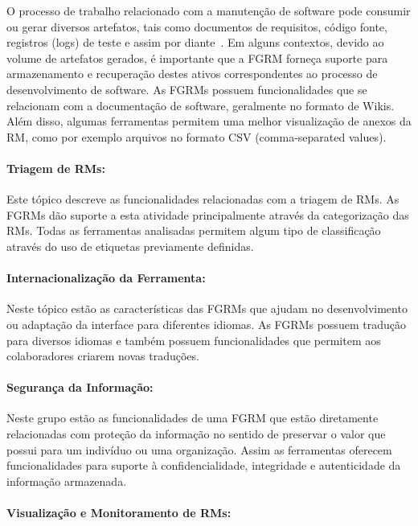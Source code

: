 O processo de trabalho relacionado com a manutenção de software pode consumir
ou gerar diversos artefatos, tais como documentos de requisitos, código fonte,
registros (logs) de teste e assim por diante~\cite{cavalcanti2013bug}. Em
alguns contextos, devido ao volume de artefatos gerados, é importante que a
FGRM forneça suporte para armazenamento e recuperação destes ativos
correspondentes ao processo de desenvolvimento de software. As FGRMs possuem
funcionalidades que se relacionam com a documentação de software,
geralmente no formato de Wikis. Além disso, algumas ferramentas permitem uma
melhor visualização de anexos da RM, como por exemplo arquivos no formato CSV
(comma-separated values).

\paragraph{Triagem de RMs:}\label{par:triagem_de_rm_s}

Este tópico descreve as funcionalidades relacionadas com a triagem de RMs. As
FGRMs dão suporte a esta atividade principalmente através da categorização das
RMs. Todas as ferramentas analisadas permitem algum tipo de classificação
através do uso de etiquetas previamente definidas.

\paragraph{Internacionalização da Ferramenta:}\label{par:internacionalização_da_ferramenta}

Neste tópico estão as características das FGRMs que ajudam no desenvolvimento
ou adaptação da interface para diferentes idiomas. As FGRMs possuem tradução
para diversos idiomas e também possuem funcionalidades que permitem aos
colaboradores criarem novas traduções.

\paragraph{Segurança da Informação:}
\label{par:segurança_da_informação}

Neste grupo estão as funcionalidades de uma FGRM que estão diretamente
relacionadas com proteção da informação no sentido de preservar o valor que
possui para um indivíduo ou uma organização. Assim as ferramentas oferecem
funcionalidades para suporte à confidencialidade, integridade e autenticidade
da informação armazenada.

\paragraph{Visualização e Monitoramento de RMs:}
\label{par:visualização_de_rm_s}

